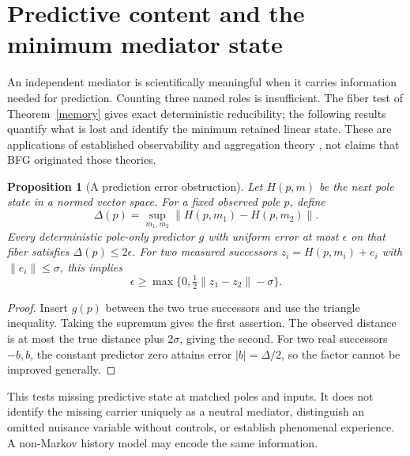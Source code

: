 \documentclass[11pt,letterpaper]{article}
\newtheorem{proposition}[theorem]{Proposition}
\theoremstyle{definition}
\numberwithin{equation}{section}
\begin{document}
\section{Predictive content and the minimum mediator state}
An independent mediator is scientifically meaningful when it carries information needed for prediction. Counting three named roles is insufficient. The fiber test of Theorem~\ref{memory} gives exact deterministic reducibility; the following results quantify what is lost and identify the minimum retained linear state. These are applications of established observability and aggregation theory \cite{kalman,buchholz}, not claims that BFG originated those theories.

\begin{proposition}[A prediction error obstruction]\label{fibererror}
Let $H(p,m)$ be the next pole state in a normed vector space. For a fixed observed pole $p$, define
\begin{equation}
\Delta(p)=\sup_{m_1,m_2}\|H(p,m_1)-H(p,m_2)\|.
\end{equation}
Every deterministic pole-only predictor $g$ with uniform error at most $\epsilon$ on that fiber satisfies $\Delta(p)\leq2\epsilon$. For two measured successors $z_i=H(p,m_i)+e_i$ with $\|e_i\|\leq\sigma$, this implies
\begin{equation}
\epsilon\geq\max\{0,\tfrac12\|z_1-z_2\|-\sigma\}.
\end{equation}
\end{proposition}
\begin{proof}
Insert $g(p)$ between the two true successors and use the triangle inequality. Taking the supremum gives the first assertion. The observed distance is at most the true distance plus $2\sigma$, giving the second. For two real successors $-b,b$, the constant predictor zero attains error $|b|=\Delta/2$, so the factor cannot be improved generally.
\end{proof}
This tests missing predictive state at matched poles and inputs. It does not identify the missing carrier uniquely as a neutral mediator, distinguish an omitted nuisance variable without controls, or establish phenomenal experience. A non-Markov history model may encode the same information.
\end{document}
